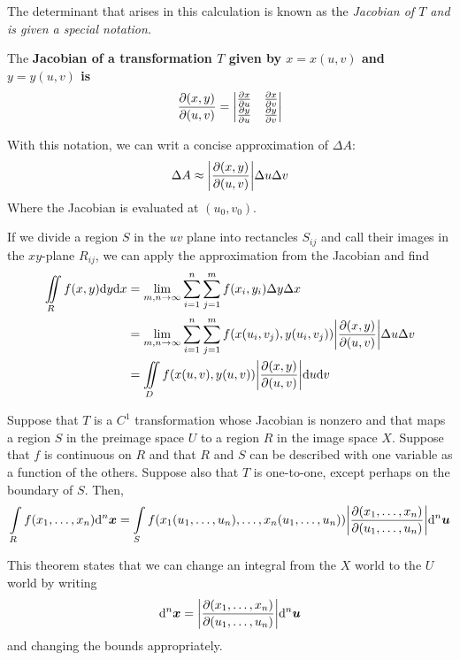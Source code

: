 The determinant that arises in this calculation is known as the \it{Jacobian} of $T$ and is given a special notation.
\begin{definition}
    The \bf{Jacobian} of a transformation $T$ given by $x = x(u, v)$ and $y = y(u, v)$ is
    \[ \frac{\partial(x,y)}{\partial(u,v)} = \begin{vmatrix}
        \pdv{x}{u} & \pdv{x}{v} \\
        \pdv{y}{u} & \pdv{y}{v}
    \end{vmatrix}\]
\end{definition}
With this notation, we can writ a concise approximation of $\Delta A$:
\[ \Delta A \approx \abs{\pdv{(x,y)}{(u,v)}}\Delta u\Delta v\]
Where the Jacobian is evaluated at $(u_0, v_0)$. \par If we divide a region $S$ in the $uv$ plane into rectancles $S_{ij}$ and call their images in the $xy$-plane $R_{ij}$, we can apply the approximation from the Jacobian and find
\begin{align*}
    \iint\limits_R f(x,y)\dd y\dd x &= \lim_{m,n\to\infty}\sum_{i=1}^n\sum_{j=1}^m f(x_i, y_i)\Delta y \Delta x\\
    &=\lim_{m,n\to\infty}\sum_{i=1}^n\sum_{j=1}^m f(x(u_i,v_j), y(u_i,v_j))\abs{\pdv{(x,y)}{(u,v)}}\Delta u\Delta v \\
    &= \iint\limits_D f(x(u,v), y(u,v))\abs{\pdv{(x,y)}{(u,v)}}\dd u\dd v
\end{align*}
\begin{theorem}
    Suppose that $T$ is a $C^1$ transformation whose Jacobian is nonzero and that maps a region $S$ in the preimage space $U$ to a region $R$ in the image space $X$. Suppose that $f$ is continuous on $R$ and that $R$ and $S$ can be described with one variable as a function of the others. Suppose also that $T$ is one-to-one, except perhaps on the boundary of $S$. Then,
    \[ \int\limits_R f(x_1, \dots, x_n)\dd ^n \boldsymbol{x} = \int\limits_S f(x_1(u_1, \dots, u_n), \dots, x_n(u_1, \dots, u_n))\abs{\pdv{(x_1, \dots, x_n)}{(u_1, \dots, u_n)}}\dd ^n \boldsymbol{u}\]
\end{theorem}
This theorem states that we can change an integral from the $X$ world to the $U$ world by writing
\[ \dd ^n\boldsymbol{x} = \abs{\pdv{(x_1, \dots, x_n)}{(u_1, \dots, u_n)}}\dd ^n \boldsymbol{u}\]
and changing the bounds appropriately.
